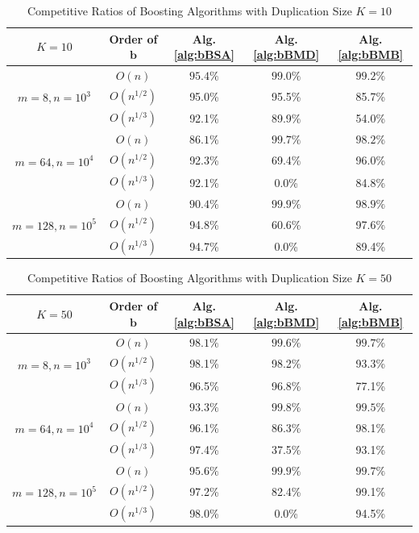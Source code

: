 \documentclass{article} %
\begin{document}
\begin{table}[H]
        \centering
        \small
        \begin{tabular}{c|c|c|c|c}
        \toprule
            $K=10$ & Order of $\bm{b}$  & Alg. \ref{alg:bBSA}& Alg. \ref{alg:bBMD} & Alg. \ref{alg:bBMB} \\
             \midrule
       \multirow{3}{*}{\scriptsize $m=8, n=10^3$}  & $O(n)$ & $95.4\%$ & $99.0\%$  & $99.2\%$\\
        &$O(n^{1/2})$ & 95.0\% & 95.5\% & 85.7\%  \\
        &$O(n^{1/3})$ & 92.1\% & 89.9\% & 54.0\%  \\
    \midrule
       \multirow{3}{*}{\scriptsize $m=64, n=10^4$}  & $O(n)$ & $86.1\%$ & $99.7\%$  & $98.2\%$ \\
        &$O(n^{1/2})$ & 92.3\% & 69.4\% & 96.0\%  \\
        &$O(n^{1/3})$ & 92.1\% & 0.0\% & 84.8\%  \\
    \midrule
       \multirow{3}{*}{\scriptsize $m=128, n=10^5$}  & $O(n)$ & $90.4\%$ & $99.9\%$  & $98.9\%$ \\
        &$O(n^{1/2})$ & 94.8\% & 60.6\% & 97.6\%  \\
        &$O(n^{1/3})$ & 94.7\% & 0.0\% & 89.4\%  \\
       \bottomrule
        \end{tabular}
            \caption{Competitive Ratios of Boosting Algorithms with Duplication Size $K=10$}
        \label{tab:bs10}
\end{table}
\begin{table}[ht!]
        \centering
        \small
        \begin{tabular}{c|c|c|c|c}
        \toprule
            $K=50$ & Order of $\bm{b}$  & Alg. \ref{alg:bBSA}& Alg. \ref{alg:bBMD} & Alg. \ref{alg:bBMB} \\
             \midrule
       \multirow{3}{*}{\scriptsize $m=8, n=10^3$}  & $O(n)$ & $98.1\%$ & $99.6\%$  & $99.7\%$\\
        &$O(n^{1/2})$ & 98.1\% & 98.2\% & 93.3\%  \\
        &$O(n^{1/3})$ & 96.5\% & 96.8\% & 77.1\%  \\
    \midrule
       \multirow{3}{*}{\scriptsize $m=64, n=10^4$}  & $O(n)$ & $93.3\%$ & $99.8\%$  & $99.5\%$ \\
        &$O(n^{1/2})$ & 96.1\% & 86.3\% & 98.1\%  \\
        &$O(n^{1/3})$ & 97.4\% & 37.5\% & 93.1\%  \\
    \midrule
       \multirow{3}{*}{\scriptsize $m=128, n=10^5$}  & $O(n)$ & $95.6\%$ & $99.9\%$  & $99.7\%$ \\
        &$O(n^{1/2})$ & 97.2\% & 82.4\% & 99.1\%  \\
        &$O(n^{1/3})$ & 98.0\% & 0.0\% & 94.5\%  \\
       \bottomrule
        \end{tabular}
            \caption{Competitive Ratios of Boosting Algorithms with Duplication Size $K=50$}
        \label{tab:bs50}
\end{table}
\end{document}

